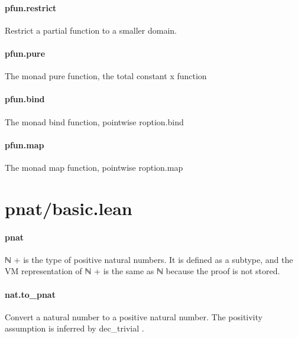 \documentclass{article}
\begin{document}
\paragraph{pfun.restrict}
\par
Restrict a partial function to a smaller domain.
\paragraph{pfun.pure}
\par
The monad 
\colorbox[RGB]{253,246,227}{{{{\color[RGB]{101, 123, 131} pure }}}} function, the total constant 
\colorbox[RGB]{253,246,227}{{{{\color[RGB]{101, 123, 131} x }}}} function
\paragraph{pfun.bind}
\par
The monad 
\colorbox[RGB]{253,246,227}{{{{\color[RGB]{101, 123, 131} bind }}}} function, pointwise 
\colorbox[RGB]{253,246,227}{{{{\color[RGB]{101, 123, 131} roption.bind }}}}\paragraph{pfun.map}
\par
The monad 
\colorbox[RGB]{253,246,227}{{{{\color[RGB]{101, 123, 131} map }}}} function, pointwise 
\colorbox[RGB]{253,246,227}{{{{\color[RGB]{101, 123, 131} roption.map }}}}\section{pnat/basic.lean}\paragraph{pnat}
\par
\colorbox[RGB]{253,246,227}{{{{\color[RGB]{101, 123, 131} ℕ }}}{{{\color[RGB]{181, 137, 0} + }}}} is the type of positive natural numbers. It is defined as a subtype,
and the VM representation of 
\colorbox[RGB]{253,246,227}{{{{\color[RGB]{101, 123, 131} ℕ }}}{{{\color[RGB]{181, 137, 0} + }}}} is the same as 
\colorbox[RGB]{253,246,227}{{{{\color[RGB]{101, 123, 131} ℕ }}}} because the proof
is not stored.
\paragraph{nat.to\_pnat}
\par
Convert a natural number to a positive natural number. The
positivity assumption is inferred by 
\colorbox[RGB]{253,246,227}{{{{\color[RGB]{101, 123, 131} dec\_trivial }}}}.
\end{document}
